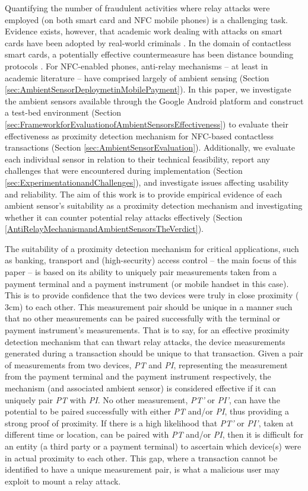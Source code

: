 \documentclass{article}
\begin{document}
Quantifying the number of fraudulent activities where relay attacks were employed (on both smart card and NFC mobile phones) is a challenging task. Evidence exists, however, that academic work dealing with attacks on smart cards have been adopted by real-world criminals \cite{Ferradi2015}.  In the domain of contactless smart cards, a potentially effective countermeasure has been distance bounding protocols \cite{Hancke:2005:RDB:1128018.1128472,trujillo2010poulidor}.  For NFC-enabled phones, anti-relay mechanisms -- at least in academic literature -- have comprised largely of ambient sensing (Section \ref{sec:AmbientSensorDeploymetinMobilePayment}). In this paper, we investigate the ambient sensors available through the Google Android platform and construct a test-bed environment (Section \ref{sec:FrameworkforEvaluationofAmbientSensorsEffectiveness}) to evaluate their effectiveness as proximity detection mechanism for NFC-based contactless transactions (Section \ref{sec:AmbientSensorEvaluation}).  Additionally, we evaluate each individual sensor in relation to their technical feasibility, report any challenges that were encountered during implementation (Section \ref{sec:ExperimentationandChallenges}), and investigate issues affecting usability and reliability.  The aim of this work is to provide empirical evidence of each ambient sensor's suitability as a proximity detection mechanism and investigating whether it can counter potential relay attacks effectively (Section \ref{AntiRelayMechanismandAmbientSensorsTheVerdict}).

The suitability of a proximity detection mechanism for critical applications, such as banking, transport and (high-security) access control -- the main focus of this paper -- is based on its ability to uniquely pair measurements taken from a payment terminal and a payment instrument (or mobile handset in this case).  This is to provide confidence that the two devices were truly in close proximity ( 3cm) to each other.  This measurement pair should be unique in a manner such that no other measurements can be paired successfully with the terminal or payment instrument's measurements.  That is to say, for an effective proximity detection mechanism that can thwart relay attacks, the device measurements generated during a transaction should be unique to that transaction.  Given a pair of measurements from two devices, \emph{PT} and \emph{PI}, representing the measurement from the payment terminal and the payment instrument respectively, the mechanism (and associated ambient sensor) is considered effective if it can uniquely pair \emph{PT} with \emph{PI}. No other measurement, \emph{PT'} or \emph{PI'}, can have the potential to be paired successfully with either \emph{PT} and/or \emph{PI}, thus providing a strong proof of proximity.  If there is a high likelihood that \emph{PT'} or \emph{PI'}, taken at different time or location, can be paired with \emph{PT} and/or \emph{PI}, then it is difficult for an entity (a third party or a payment terminal) to ascertain which device(s) were in actual proximity to each other.  This gap, where a transaction cannot be identified to have a unique measurement pair, is what a malicious user may exploit to mount a relay attack.   
\end{document}
